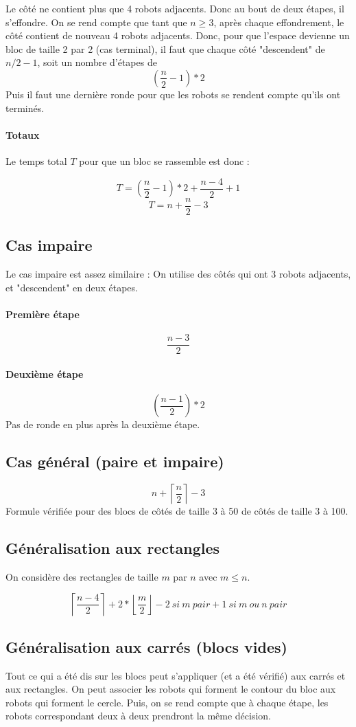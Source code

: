 \documentclass[11pt, a4paper]{article}
\begin{document}
Le côté ne contient plus que 4 robots adjacents. Donc au bout de deux
étapes, il s'effondre. On se rend compte que tant que $n \geq 3$,
après chaque effondrement, le côté contient de nouveau 4 robots adjacents. Donc,
pour que l'espace devienne un bloc de taille 2 par 2 (cas terminal), il faut
que chaque côté "descendent" de $n/2-1$, soit un nombre d'étapes de
\[ ( \frac{n}{2} -1 ) *2 \]
Puis il faut une dernière ronde pour que les robots se rendent compte qu'ils
ont terminés.

\paragraph{Totaux} Le temps total $T$ pour que un bloc se rassemble
est donc :

\[ T = ( \frac{n}{2} -1 ) *2 + \frac{n-4}{2} + 1 \]
\[ T = n + \frac{n}{2} - 3 \]


\subsection{Cas impaire}

Le cas impaire est assez similaire :
On utilise des côtés qui ont 3 robots adjacents, et "descendent" en deux
étapes.

\paragraph{Première étape}
\[ \frac{n-3}{2} \]

\paragraph{Deuxième étape}
\[ ( \frac{n-1}{2} ) *2 \]
Pas de ronde en plus après la deuxième étape.

\subsection{Cas général (paire et impaire)}
\[ n + \left\lceil \frac{n}{2} \right\rceil -3 \]
Formule vérifiée pour des blocs de côtés de taille 3 à 50 de côtés de taille 3
à 100.

\subsection{Généralisation aux rectangles}

On considère des rectangles de taille $m$ par $n$ avec $m \leq n$.

\[
    \left\lceil \frac{n-4}{2} \right\rceil
  + 2*\left\lfloor \frac{m}{2} \right\rfloor
  -2\ si\ m\ pair
  +1\ si\ m\ ou\ n\ pair
\]

\subsection{Généralisation aux carrés (blocs vides)}

Tout ce qui a été dis sur les blocs peut s'appliquer (et a été vérifié) aux
carrés et aux rectangles. On peut associer les robots qui forment le contour du
bloc aux robots qui forment le cercle. Puis, on se rend compte que à chaque
étape, les robots correspondant deux à deux prendront la même décision.
\end{document}
